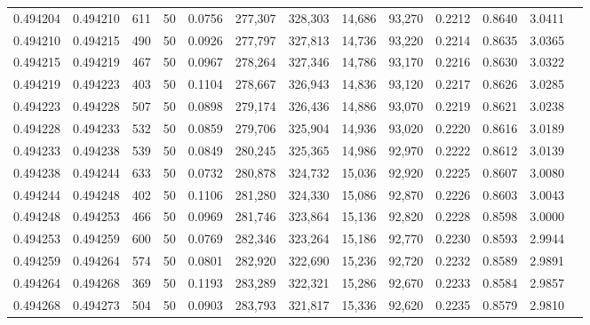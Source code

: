 \begin{tabular}{rrrrrrrrrrrrr}
0.494204 & 0.494210 &   611 &  50 &                                     0.0756 & 277,307 & 328,303 &  14,686 &  93,270 & 0.2212 & 0.8640 & 3.0411 \\
0.494210 & 0.494215 &   490 &  50 &                                     0.0926 & 277,797 & 327,813 &  14,736 &  93,220 & 0.2214 & 0.8635 & 3.0365 \\
0.494215 & 0.494219 &   467 &  50 &                                     0.0967 & 278,264 & 327,346 &  14,786 &  93,170 & 0.2216 & 0.8630 & 3.0322 \\
0.494219 & 0.494223 &   403 &  50 &                                     0.1104 & 278,667 & 326,943 &  14,836 &  93,120 & 0.2217 & 0.8626 & 3.0285 \\
0.494223 & 0.494228 &   507 &  50 &                                     0.0898 & 279,174 & 326,436 &  14,886 &  93,070 & 0.2219 & 0.8621 & 3.0238 \\
0.494228 & 0.494233 &   532 &  50 &                                     0.0859 & 279,706 & 325,904 &  14,936 &  93,020 & 0.2220 & 0.8616 & 3.0189 \\
0.494233 & 0.494238 &   539 &  50 &                                     0.0849 & 280,245 & 325,365 &  14,986 &  92,970 & 0.2222 & 0.8612 & 3.0139 \\
0.494238 & 0.494244 &   633 &  50 &                                     0.0732 & 280,878 & 324,732 &  15,036 &  92,920 & 0.2225 & 0.8607 & 3.0080 \\
0.494244 & 0.494248 &   402 &  50 &                                     0.1106 & 281,280 & 324,330 &  15,086 &  92,870 & 0.2226 & 0.8603 & 3.0043 \\
0.494248 & 0.494253 &   466 &  50 &                                     0.0969 & 281,746 & 323,864 &  15,136 &  92,820 & 0.2228 & 0.8598 & 3.0000 \\
0.494253 & 0.494259 &   600 &  50 &                                     0.0769 & 282,346 & 323,264 &  15,186 &  92,770 & 0.2230 & 0.8593 & 2.9944 \\
0.494259 & 0.494264 &   574 &  50 &                                     0.0801 & 282,920 & 322,690 &  15,236 &  92,720 & 0.2232 & 0.8589 & 2.9891 \\
0.494264 & 0.494268 &   369 &  50 &                                     0.1193 & 283,289 & 322,321 &  15,286 &  92,670 & 0.2233 & 0.8584 & 2.9857 \\
0.494268 & 0.494273 &   504 &  50 &                                     0.0903 & 283,793 & 321,817 &  15,336 &  92,620 & 0.2235 & 0.8579 & 2.9810 \\

\end{tabular}
